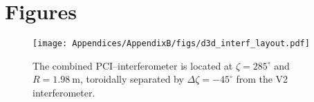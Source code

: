 \chapter{Figures}

\begin{figure}[ht]
\centering
\texttt{[image: Appendices/AppendixB/figs/d3d\_interf\_layout.pdf]}
\caption{%
  The combined PCI--interferometer is located at
  $\zeta = 285^{\circ}$ and $R = \SI{1.98}{\meter}$,
  toroidally separated by $\Delta \zeta = -45^{\circ}$
  from the V2 interferometer.}
\label{fig:d3d_interf_layout}
\end{figure}

\clearpage
\newpage
